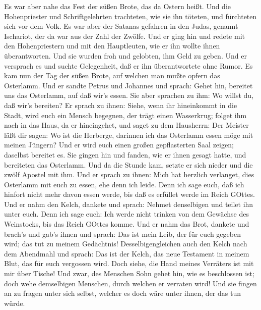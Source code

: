  Es war aber nahe das Fest der süßen Brote, das da Ostern
heißt.  Und die Hohenpriester und Schriftgelehrten
trachteten, wie sie ihn töteten, und fürchteten sich vor dem Volk.
 Es war aber der Satanas gefahren in den Judas, genannt
Ischariot, der da war aus der Zahl der Zwölfe.  Und er ging
hin und redete mit den Hohenpriestern und mit den Hauptleuten, wie er
ihn wollte ihnen überantworten.  Und sie wurden froh und
gelobten, ihm Geld zu geben.  Und er versprach es und suchte
Gelegenheit, daß er ihn überantwortete ohne Rumor.  Es kam
nun der Tag der süßen Brote, auf welchen man mußte opfern das Osterlamm.
 Und er sandte Petrus und Johannes und sprach: Gehet hin,
bereitet uns das Osterlamm, auf daß wir's essen.  Sie aber
sprachen zu ihm: Wo willst du, daß wir's bereiten?  Er
sprach zu ihnen: Siehe, wenn ihr hineinkommt in die Stadt, wird euch ein
Mensch begegnen, der trägt einen Wasserkrug; folget ihm nach in das
Haus, da er hineingehet,  und saget zu dem Hausherrn: Der
Meister läßt dir sagen: Wo ist die Herberge, darinnen ich das Osterlamm
essen möge mit meinen Jüngern?  Und er wird euch einen
großen gepflasterten Saal zeigen; daselbst bereitet es. 
Sie gingen hin und fanden, wie er ihnen gesagt hatte, und bereiteten das
Osterlamm.  Und da die Stunde kam, setzte er sich nieder
und die zwölf Apostel mit ihm.  Und er sprach zu ihnen:
Mich hat herzlich verlanget, dies Osterlamm mit euch zu essen, ehe denn
ich leide.  Denn ich sage euch, daß ich hinfort nicht mehr
davon essen werde, bis daß es erfüllet werde im Reich GOttes.
 Und er nahm den Kelch, dankete und sprach: Nehmet
denselbigen und teilet ihn unter euch.  Denn ich sage euch:
Ich werde nicht trinken von dem Gewächse des Weinstocks, bis das Reich
GOttes komme.  Und er nahm das Brot, dankete und brach's
und gab's ihnen und sprach: Das ist mein Leib, der für euch gegeben
wird; das tut zu meinem Gedächtnis!  Desselbigengleichen
auch den Kelch nach dem Abendmahl und sprach: Das ist der Kelch, das
neue Testament in meinem Blut, das für euch vergossen wird.
 Doch siehe, die Hand meines Verräters ist mit mir über
Tische!  Und zwar, des Menschen Sohn gehet hin, wie es
beschlossen ist; doch wehe demselbigen Menschen, durch welchen er
verraten wird!  Und sie fingen an zu fragen unter sich
selbst, welcher es doch wäre unter ihnen, der das tun würde.
